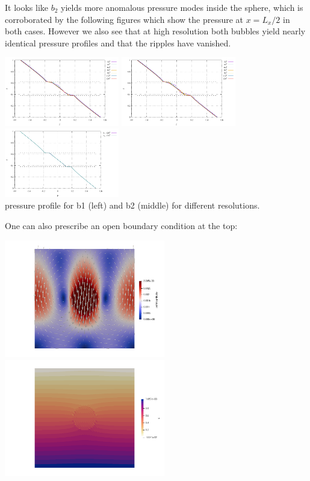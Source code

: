 It looks like $b_2$ yields more anomalous pressure modes inside the sphere, 
which is corroborated by the following figures which show the pressure 
at $x=L_x/2$ in both cases. However we also see that at high resolution both 
bubbles yield nearly identical pressure profiles and that the ripples have vanished. 

\begin{center}
\includegraphics[width=5cm]{python_codes/fieldstone_72/results/sphere/pline_b1_closed}
\includegraphics[width=5cm]{python_codes/fieldstone_72/results/sphere/pline_b2_closed}
\includegraphics[width=5cm]{python_codes/fieldstone_72/results/sphere/pline_b12_closed}\\
{\captionfont pressure profile for b1 (left) and b2 (middle) for different resolutions.}
\end{center}

One can also prescribe an open boundary condition at the top:

\begin{center}
\includegraphics[width=7cm]{python_codes/fieldstone_72/results/sphere/open/vel}
\includegraphics[width=7cm]{python_codes/fieldstone_72/results/sphere/open/p}
\end{center}


